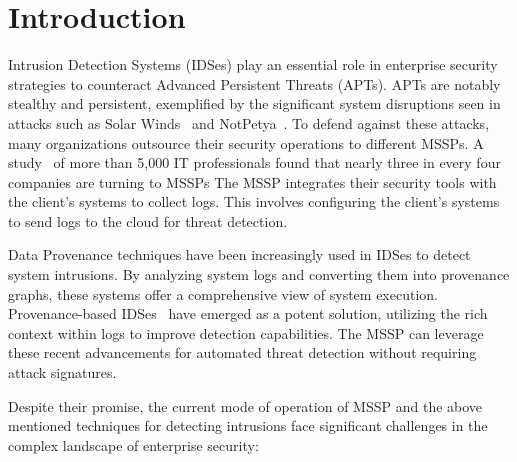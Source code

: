 \section{Introduction}
\label{s:intro}



Intrusion Detection Systems (IDSes) play an essential role in enterprise security strategies to counteract Advanced Persistent Threats (APTs). APTs are notably stealthy and persistent, exemplified by the significant system disruptions seen in attacks such as Solar Winds~\cite{solarwinds} and NotPetya~\cite{notpetya}. To defend against these attacks, many organizations outsource their security operations to different MSSPs. A study~\cite{msspsurvey}  of more than 5,000 IT professionals found that nearly three in every four companies are turning to MSSPs The MSSP integrates their security tools with the client's systems to collect \logs logs. This involves configuring the client’s systems to send \logs logs to the cloud for threat detection. 

Data Provenance techniques have been increasingly used in IDSes to detect system intrusions. By analyzing system logs and converting them into provenance graphs, these systems offer a comprehensive view of system execution. Provenance-based IDSes~\cite{streamspot,provdetector2020,wang2022threatrace,shadewatcher,yangprographer,han2020unicorn} have emerged as a potent solution, utilizing the rich context within \logs logs to improve detection capabilities. The MSSP can leverage these recent advancements for automated threat detection without requiring attack signatures.

Despite their promise, the current mode of operation of MSSP and the above mentioned techniques for detecting intrusions face significant challenges in the complex landscape of enterprise security:

